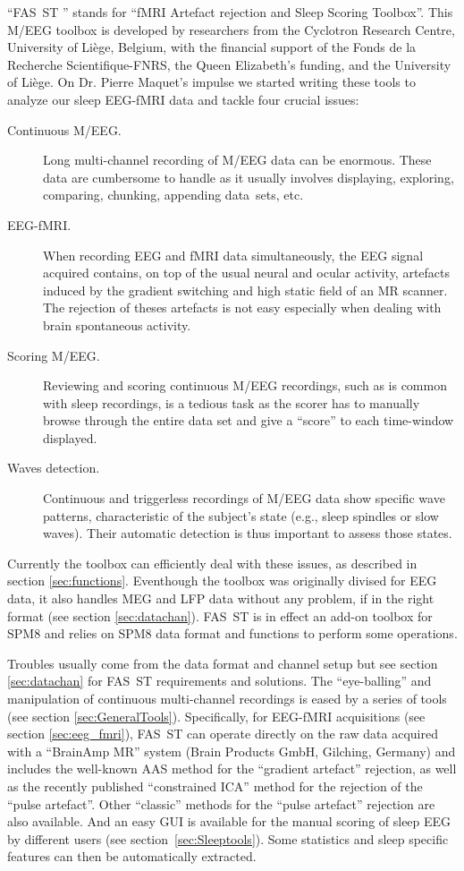 \documentclass[a4paper,titlepage]{article}
\def\dblS{\hbox{S\hskip -4.5pt S}}
\newcommand{\fasst}{FA\dblS T } 	%
\begin{document}
``\fasst\hspace{-4pt}'' stands for ``fMRI Artefact rejection and Sleep Scoring Toolbox''. This M/EEG toolbox is developed by researchers from the Cyclotron Research Centre, University of Li\`ege, Belgium, with the financial support of the Fonds de la Recherche Scientifique-FNRS, the Queen Elizabeth's funding, and the University of Li\`ege.
On Dr. Pierre Maquet's impulse we started writing these tools to analyze our sleep EEG-fMRI data and tackle four crucial issues:
\begin{description}
	\item[Continuous M/EEG.]Long multi-channel recording of M/EEG data can be enormous. These data are cumbersome to handle as it usually involves displaying, exploring, comparing, chunking, appending data~sets, etc.
    \item[EEG-fMRI.]When recording EEG and fMRI data simultaneously, the EEG signal acquired contains, on top of the usual neural and ocular activity, artefacts induced by the gradient switching and high static field of an MR scanner. The rejection of theses artefacts is not easy especially when dealing with brain spontaneous activity.
    \item[Scoring M/EEG.]Reviewing and scoring continuous M/EEG recordings, such as is common with sleep recordings, is a tedious task as the scorer has to manually browse through the entire data set and give a ``score'' to each time-window displayed.
    \item[Waves detection.] Continuous and triggerless recordings of M/EEG data show specific wave patterns, characteristic of the subject's state (e.g., sleep spindles or slow waves). Their automatic detection is thus important to assess those states.
\end{description}
Currently the toolbox can efficiently deal with these issues, as described in section \ref{sec:functions}. Eventhough the toolbox was originally divised for EEG data, it also handles MEG and LFP data without any problem, if in the right format (see section \ref{sec:datachan}). 
\fasst is in effect an add-on toolbox for SPM8\cite{SPM8,Litvak2011} and relies on SPM8 data format and functions to perform some operations.

Troubles usually come from the data format and channel setup but see section \ref{sec:datachan} for \fasst requirements and solutions. The ``eye-balling'' and manipulation of continuous multi-channel recordings is eased by a series of tools (see section \ref{sec:GeneralTools}).
Specifically, for EEG-fMRI acquisitions (see section \ref{sec:eeg_fmri}), \fasst can operate directly on the raw data acquired with a ``BrainAmp MR'' system (Brain Products GmbH, Gilching, Germany) and includes the well-known AAS method\cite{Allen2000} for the ``gradient artefact'' rejection, as well as the recently published ``constrained ICA'' method\cite{Leclercq2009} for the rejection of the ``pulse artefact''. Other ``classic'' methods for the ``pulse artefact'' rejection are also available. And an easy GUI is available for the manual scoring of sleep EEG by different users (see section~\ref{sec:Sleeptools}). Some statistics and sleep specific features can then be automatically extracted.
\end{document}
